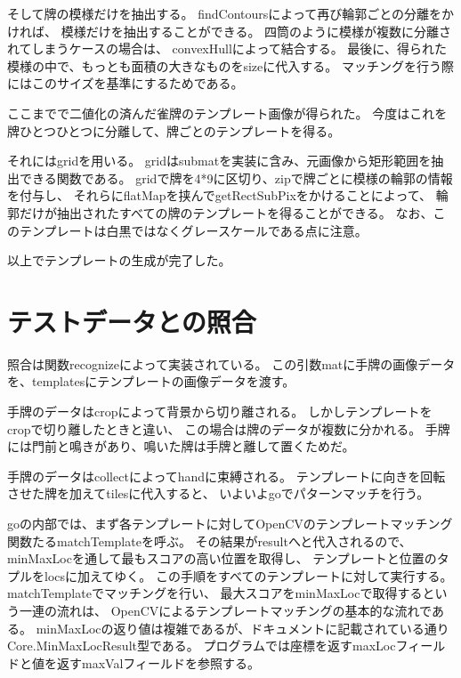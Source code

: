 \documentclass{jsarticle}
\begin{document}
\begin{multicols}{2}
そして牌の模様だけを抽出する。
findContoursによって再び輪郭ごとの分離をかければ、
模様だけを抽出することができる。
四筒のように模様が複数に分離されてしまうケースの場合は、
convexHullによって結合する。
最後に、得られた模様の中で、もっとも面積の大きなものをsizeに代入する。
マッチングを行う際にはこのサイズを基準にするためである。

ここまでで二値化の済んだ雀牌のテンプレート画像が得られた。
今度はこれを牌ひとつひとつに分離して、牌ごとのテンプレートを得る。

それにはgridを用いる。
gridはsubmatを実装に含み、元画像から矩形範囲を抽出できる関数である。
gridで牌を4*9に区切り、zipで牌ごとに模様の輪郭の情報を付与し、
それらにflatMapを挟んでgetRectSubPixをかけることによって、
輪郭だけが抽出されたすべての牌のテンプレートを得ることができる。
なお、このテンプレートは白黒ではなくグレースケールである点に注意。

以上でテンプレートの生成が完了した。

\section{テストデータとの照合}

照合は関数recognizeによって実装されている。
この引数matに手牌の画像データを、templatesにテンプレートの画像データを渡す。

手牌のデータはcropによって背景から切り離される。
しかしテンプレートをcropで切り離したときと違い、
この場合は牌のデータが複数に分かれる。
手牌には門前と鳴きがあり、鳴いた牌は手牌と離して置くためだ。

手牌のデータはcollectによってhandに束縛される。
テンプレートに向きを回転させた牌を加えてtilesに代入すると、
いよいよgoでパターンマッチを行う。

	
goの内部では、まず各テンプレートに対してOpenCVのテンプレートマッチング関数たるmatchTemplateを呼ぶ。
その結果がresultへと代入されるので、
minMaxLocを通して最もスコアの高い位置を取得し、
テンプレートと位置のタプルをlocsに加えてゆく。
この手順をすべてのテンプレートに対して実行する。
matchTemplateでマッチングを行い、
最大スコアをminMaxLocで取得するという一連の流れは、
OpenCVによるテンプレートマッチングの基本的な流れである。
minMaxLocの返り値は複雑であるが、ドキュメントに記載されている\cite{minMaxLoc}通り
Core.MinMaxLocResult型である。
プログラムでは座標を返すmaxLocフィールドと値を返すmaxValフィールドを参照する。


\end{multicols}
\end{document}
